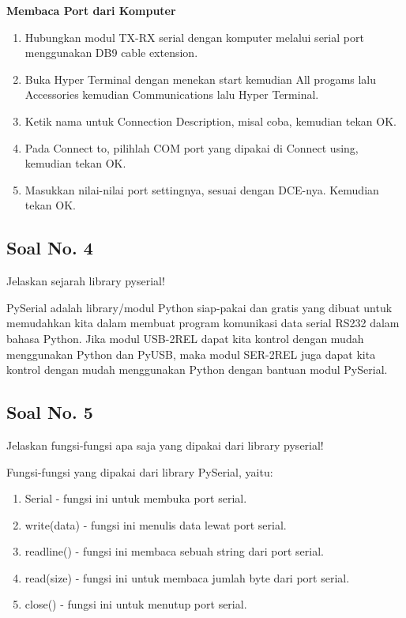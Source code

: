 \hfill \break
\textbf{Membaca Port dari Komputer}

\begin{enumerate}
    \item Hubungkan modul TX-RX serial dengan komputer melalui serial port menggunakan DB9 cable extension.
    \item Buka Hyper Terminal dengan menekan start kemudian All progams lalu Accessories kemudian Communications lalu Hyper Terminal.
    \item Ketik nama untuk Connection Description, misal coba, kemudian tekan OK.
    \item Pada Connect to, pilihlah COM port yang dipakai di Connect using, kemudian tekan OK.
    \item Masukkan nilai-nilai port settingnya, sesuai dengan DCE-nya. Kemudian tekan OK.
\end{enumerate}

\subsection{Soal No. 4}
Jelaskan sejarah library pyserial!

\hfill \break
PySerial adalah library/modul Python siap-pakai dan gratis yang dibuat untuk memudahkan kita dalam membuat program komunikasi data serial RS232 dalam bahasa Python.
Jika modul USB-2REL dapat kita kontrol dengan mudah menggunakan Python dan PyUSB, maka modul SER-2REL juga dapat kita kontrol dengan mudah menggunakan Python dengan bantuan modul PySerial.

\subsection{Soal No. 5}
Jelaskan fungsi-fungsi apa saja yang dipakai dari library pyserial!

\hfill \break
Fungsi-fungsi yang dipakai dari library PySerial, yaitu:
\begin{enumerate}
    \item Serial - fungsi ini untuk membuka port serial.
    \item write(data) - fungsi ini menulis data lewat port serial.
    \item readline() - fungsi ini membaca sebuah string dari port serial.
    \item read(size) - fungsi ini untuk membaca jumlah byte dari port serial.
    \item close() - fungsi ini untuk menutup port serial.
\end{enumerate}

